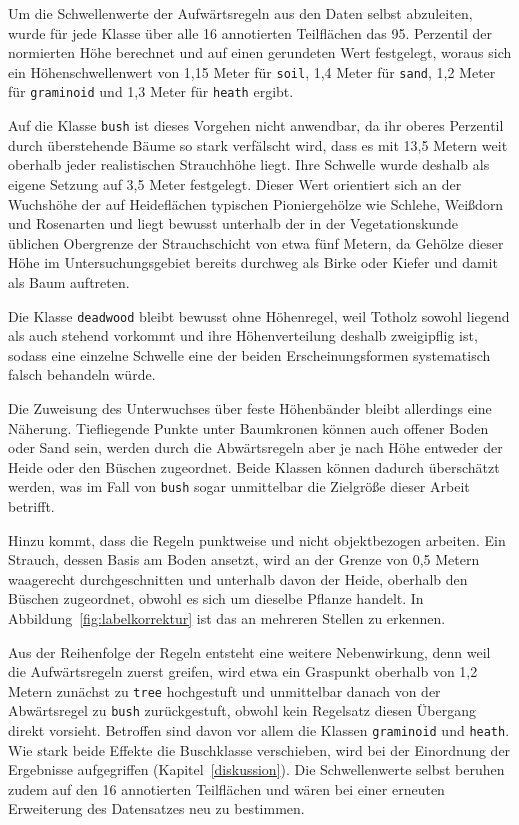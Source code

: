 Um die Schwellenwerte der Aufwärtsregeln aus den Daten selbst abzuleiten, wurde für jede Klasse über alle 16 annotierten Teilflächen das 95. Perzentil der normierten Höhe berechnet und auf einen gerundeten Wert festgelegt, woraus sich ein Höhenschwellenwert von 1,15 Meter für \texttt{soil}, 1,4 Meter für \texttt{sand}, 1,2 Meter für \texttt{graminoid} und 1,3 Meter für \texttt{heath} ergibt.

Auf die Klasse \texttt{bush} ist dieses Vorgehen nicht anwendbar, da ihr oberes Perzentil durch überstehende Bäume so stark verfälscht wird, dass es mit 13,5 Metern weit oberhalb jeder realistischen Strauchhöhe liegt. Ihre Schwelle wurde deshalb als eigene Setzung auf 3,5 Meter festgelegt. Dieser Wert orientiert sich an der Wuchshöhe der auf Heideflächen typischen Pioniergehölze wie Schlehe, Weißdorn und Rosenarten \cite{Schoknecht.1998} und liegt bewusst unterhalb der in der Vegetationskunde üblichen Obergrenze der Strauchschicht von etwa fünf Metern, da Gehölze dieser Höhe im Untersuchungsgebiet bereits durchweg als Birke oder Kiefer und damit als Baum auftreten.

Die Klasse \texttt{deadwood} bleibt bewusst ohne Höhenregel, weil Totholz sowohl liegend als auch stehend vorkommt und ihre Höhenverteilung deshalb zweigipflig ist, sodass eine einzelne Schwelle eine der beiden Erscheinungsformen systematisch falsch behandeln würde.

Die Zuweisung des Unterwuchses über feste Höhenbänder bleibt allerdings eine Näherung. Tiefliegende Punkte unter Baumkronen können auch offener Boden oder Sand sein, werden durch die Abwärtsregeln aber je nach Höhe entweder der Heide oder den Büschen zugeordnet. Beide Klassen können dadurch überschätzt werden, was im Fall von \texttt{bush} sogar unmittelbar die Zielgröße dieser Arbeit betrifft.

Hinzu kommt, dass die Regeln punktweise und nicht objektbezogen arbeiten. Ein Strauch, dessen Basis am Boden ansetzt, wird an der Grenze von 0,5 Metern waagerecht durchgeschnitten und unterhalb davon der Heide, oberhalb den Büschen zugeordnet, obwohl es sich um dieselbe Pflanze handelt. In Abbildung~\ref{fig:labelkorrektur} ist das an mehreren Stellen zu erkennen.

Aus der Reihenfolge der Regeln entsteht eine weitere Nebenwirkung, denn weil die Aufwärtsregeln zuerst greifen, wird etwa ein Graspunkt oberhalb von 1,2 Metern zunächst zu \texttt{tree} hochgestuft und unmittelbar danach von der Abwärtsregel zu \texttt{bush} zurückgestuft, obwohl kein Regelsatz diesen Übergang direkt vorsieht. Betroffen sind davon vor allem die Klassen \texttt{graminoid} und \texttt{heath}. Wie stark beide Effekte die Buschklasse verschieben, wird bei der Einordnung der Ergebnisse aufgegriffen (Kapitel~\ref{diskussion}). Die Schwellenwerte selbst beruhen zudem auf den 16 annotierten Teilflächen und wären bei einer erneuten Erweiterung des Datensatzes neu zu bestimmen.

